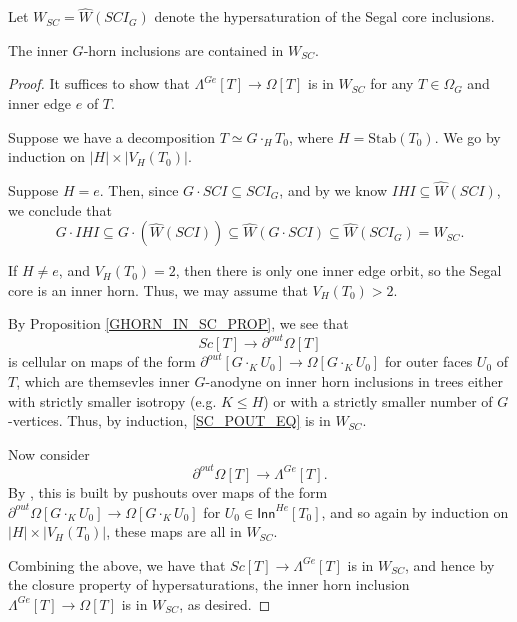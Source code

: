 \documentclass[a4paper,10pt,draft]{article}%
\numberwithin{equation}{section}%
\begin{document}
\begin{definition}
      Let $W_{SC} = \hat{W}(SCI_G)$ denote the hypersaturation of the Segal core inclusions.
\end{definition}

\begin{lemma}
      \label{GHORN_IN_SC_PROP}
      The inner $G$-horn inclusions are contained in $W_{SC}$.
\end{lemma}
\begin{proof}
      It suffices to show that $\Lambda^{G e}[T] \to \Omega[T]$ is in $W_{SC}$
      for any $T\in \Omega_G$ and inner edge $e$ of $T$.

      Suppose we have a decomposition $T \simeq G \cdot_H T_0$, where $H = \mathrm{Stab}(T_0)$.
      We go by induction on $|H| \times |V_H(T_0)|$.

      Suppose $H = e$.
      Then, since $G \cdot SCI \subseteq SCI_G$,
      and by \cite[2.5]{CM13a} we know $IHI \subseteq \hat{W}(SCI)$, we conclude that
      \begin{equation}
            G \cdot IHI \subseteq G \cdot (\hat{W}(SCI)) \subseteq \hat{W}(G \cdot SCI) \subseteq \hat{W}(SCI_G) = W_{SC}.
      \end{equation}
      
      If $H \neq e$, and $V_H(T_0) = 2$, then there is only one inner edge orbit, so
      the Segal core is an inner horn.
      Thus, we may assume that $V_H(T_0) > 2$.

      By Proposition \ref{GHORN_IN_SC_PROP}, we see that
      \begin{equation}
            \label{SC_POUT_EQ}
            Sc[T] \to \partial^{out}\Omega[T]
      \end{equation}
      is cellular on maps of the form
      $\partial^{out}[G \cdot_K U_0] \to \Omega[G \cdot_K U_0]$ for outer faces $U_0$ of $T$,
      which are themsevles inner $G$-anodyne on inner horn inclusions in trees either
      with strictly smaller isotropy (e.g. $K \leq H$) or
      with a strictly smaller number of $G$-vertices.
      Thus, by induction, \eqref{SC_POUT_EQ} is in $W_{SC}$. 

      Now consider
      \begin{equation}
            \label{POUT_GHORN_EQ}
            \partial^{out}\Omega[T] \to \Lambda^{G e}[T].
      \end{equation}
      By \cite[Proposition 6.17]{Per17},
      this is built by pushouts over maps of the form
      $\partial^{out}\Omega[G \cdot_K U_0] \to \Omega[G \cdot_K U_0]$ for $U_0 \in \mathsf{Inn}^{H e}[T_0]$,
      and so again by induction on $|H| \times |V_H(T_0)|$, these maps are all in $W_{SC}$. 
      
      Combining the above, we have that $Sc[T] \to \Lambda^{G e}[T]$ is in $W_{SC}$, and hence
      by the closure property of hypersaturations, the inner horn inclusion $\Lambda^{G e}[T] \to \Omega[T]$
      is in $W_{SC}$, as desired.
\end{proof}
\end{document}
